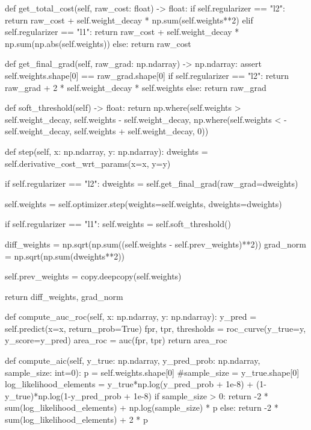 \documentclass[14pt, a4paper]{article}
\theoremstyle{sltheorem}
\theoremstyle{soltheorem}
\begin{document}
\begin{python}
    def get_total_cost(self, raw_cost: float) -> float:
        if self.regularizer == "l2":
            return raw_cost + self.weight_decay * np.sum(self.weights**2)
        elif self.regularizer == "l1":
            return raw_cost + self.weight_decay * np.sum(np.abs(self.weights))
        else:
            return raw_cost
        
    
    def get_final_grad(self, raw_grad: np.ndarray) -> np.ndarray:
        assert self.weights.shape[0] == raw_grad.shape[0]
        if self.regularizer == "l2":
            return raw_grad + 2 * self.weight_decay * self.weights
        else:
            return raw_grad
        
        
    def soft_threshold(self) -> float:
        return np.where(self.weights > self.weight_decay, self.weights - self.weight_decay, np.where(self.weights < - self.weight_decay, self.weights + self.weight_decay, 0))
        
        
    def step(self, x: np.ndarray, y: np.ndarray):
        dweights = self.derivative_cost_wrt_params(x=x, y=y)
        
        if self.regularizer == "l2":
            dweights = self.get_final_grad(raw_grad=dweights)
            
        self.weights = self.optimizer.step(weights=self.weights, dweights=dweights)
        
        if self.regularizer == "l1":
            self.weights = self.soft_threshold()
        
        diff_weights = np.sqrt(np.sum((self.weights - self.prev_weights)**2))
        grad_norm = np.sqrt(np.sum(dweights**2))
        
        self.prev_weights = copy.deepcopy(self.weights)
        
        return diff_weights, grad_norm
    
    
    def compute_auc_roc(self, x: np.ndarray, y: np.ndarray):
        y_pred = self.predict(x=x, return_prob=True)
        fpr, tpr, thresholds = roc_curve(y_true=y, y_score=y_pred)
        area_roc = auc(fpr, tpr)
        return area_roc
    

    def compute_aic(self, y_true: np.ndarray, y_pred_prob: np.ndarray, sample_size: int=0):
        p = self.weights.shape[0]
        #sample_size = y_true.shape[0]
        log_likelihood_elements = y_true*np.log(y_pred_prob + 1e-8) + (1-y_true)*np.log(1-y_pred_prob + 1e-8)
        if sample_size > 0:
            return -2 * sum(log_likelihood_elements) + np.log(sample_size) * p
        else:
            return -2 * sum(log_likelihood_elements) + 2 * p
        

\end{python}
\end{document}
